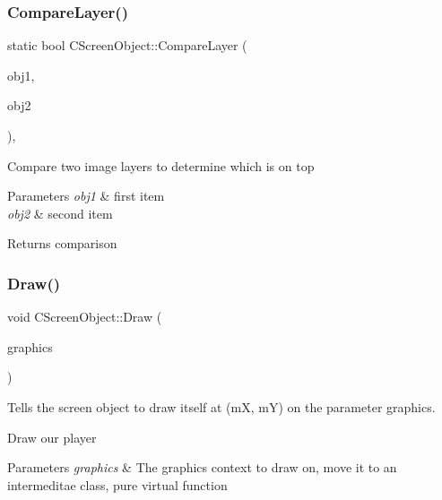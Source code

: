 \subsubsection{\texorpdfstring{CompareLayer()}{CompareLayer()}}
{\footnotesize\ttfamily static bool C\+Screen\+Object\+::\+Compare\+Layer (\begin{DoxyParamCaption}\item[{std\+::shared\+\_\+ptr$<$ \mbox{\hyperlink{class_c_screen_object}{C\+Screen\+Object}} $>$}]{obj1,  }\item[{std\+::shared\+\_\+ptr$<$ \mbox{\hyperlink{class_c_screen_object}{C\+Screen\+Object}} $>$}]{obj2 }\end{DoxyParamCaption})\hspace{0.3cm}{\ttfamily [inline]}, {\ttfamily [static]}}

Compare two image layers to determine which is on top 
\begin{DoxyParams}{Parameters}
{\em obj1} & first item \\
\hline
{\em obj2} & second item \\
\hline
\end{DoxyParams}
\begin{DoxyReturn}{Returns}
comparison 
\end{DoxyReturn}
\mbox{\label{class_c_screen_object_ad9481ae325ca2374986c61fb6545fbe2}} 
\subsubsection{\texorpdfstring{Draw()}{Draw()}}
{\footnotesize\ttfamily void C\+Screen\+Object\+::\+Draw (\begin{DoxyParamCaption}\item[{Gdiplus\+::\+Graphics $\ast$}]{graphics }\end{DoxyParamCaption})\hspace{0.3cm}{\ttfamily [virtual]}}



Tells the screen object to draw itself at (mX, mY) on the parameter graphics. 

Draw our player 
\begin{DoxyParams}{Parameters}
{\em graphics} & The graphics context to draw on, move it to an intermeditae class, pure virtual function \\
\hline
\end{DoxyParams}


